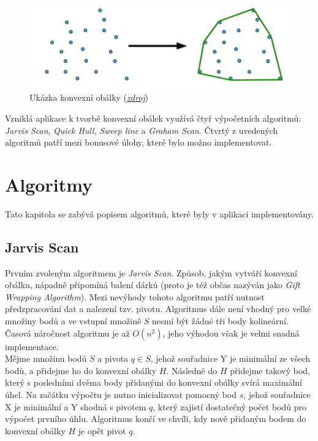 \documentclass[a4paper, 12pt]{article}
\begin{document}
\begin{figure}[h!]
	\centering
	\includegraphics[width=13cm]{./pictures/ch.png}
	\caption{Ukázka konvexní obálky (\href{http://mind.cs.byu.edu/courses/312/projects/project2_files/ConvexHull_python.php}{\textsl{zdroj}})}
\end{figure}

Vzniklá aplikace k tvorbě konvexní obálek využívá čtyř výpočetních algoritmů: \textit{Jarvis Scan}, \textit{Quick Hull}, \textit{Sweep line} a \textit{Graham Scan}. Čtvrtý z uvedených algoritmů patří mezi bonusové úlohy, které bylo možno implementovat.

\section{Algoritmy}
Tato kapitola se zabývá popisem algoritmů, které byly v aplikaci implementovány. 

\subsection{Jarvis Scan}
Prvním zvoleným algoritmem je \textit{Jarvis Scan}. Způsob, jakým vytváří konvexní obálku, nápadně připomíná balení dárků (proto je též občas nazýván jako \textit{Gift Wrapping Algorithm}). Mezi nevýhody tohoto algoritmu patří nutnost předzpracování dat a nalezení tzv. pivotu. Algoritmus dále není vhodný pro velké množiny bodů a ve vstupní množině $S$ nesmí být žádné tři body kolineární. Časová náročnost algoritmu je až $O(n^2)$, jeho výhodou však je velmi snadná implementace. \\

Mějme množinu bodů $S$ a pivota $q \in S$, jehož souřadnice Y je minimální ze všech bodů, a přidejme ho do konvexní obálky $H$. Následně do $H$ přidejme takový bod, který s posledními dvěma body přidanými do konvexní obálky svírá maximální úhel. Na začátku výpočtu je nutno inicializovat pomocný bod $s$, jehož souřadnice X je minimální a Y shodná s pivotem $q$, který zajistí dostatečný počet bodů pro výpočet prvního úhlu. Algoritmus končí ve chvíli, kdy nově přidaným bodem do konvexní obálky $H$ je opět pivot $q$. \\
\end{document}
